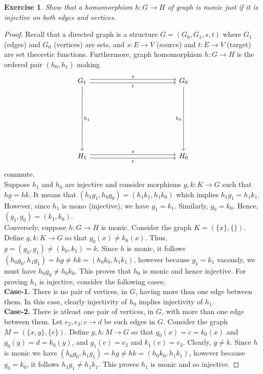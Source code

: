\documentclass[a4paper, 11pt]{book}
\theoremstyle{plain}
\newtheorem{exercise}{Exercise}[chapter]
\theoremstyle{plain}
\newcommand{\arr}{\rightarrow}
\newcommand{\tb}{\textbf}
\begin{document}
  \begin{exercise}
    Show that a homomorphism $h: G \arr H$ of graph is monic just if it is injective on both edges and vertices.
  \end{exercise}
  \begin{proof}
    Recall that a directed graph is a structure $G=(G_0, G_1, s,t)$ where $G_1$ (edges) and $G_0$ (vertices) are sets, and $s:E \arr V$ (source) and $t: E \arr V$ (target) are set theoretic functions. Furthermore, graph homomorphism $h: G \arr H$ is the ordered pair $(h_0, h_1)$ making 
    \[\begin{tikzcd}
      {G_1} &&&&& {G_0} \\
      \\
      \\
      \\
      \\
      {H_1} &&&&& {H_0}
      \arrow["s", shift left=1, from=1-1, to=1-6]
      \arrow["{h_1}", from=1-1, to=6-1]
      \arrow["{h_0}"', from=1-6, to=6-6]
      \arrow["s", shift left=1, from=6-1, to=6-6]
      \arrow["t"', shift right=1, from=1-1, to=1-6]
      \arrow["t"', shift right=1, from=6-1, to=6-6]
    \end{tikzcd}\]
    commute. \\
    Suppose $h_1$ and $h_0$ are injective and consider morphisms $g, k: K \arr G$ such that $hg=hk$. It means that $(h_1g_1, h_0g_0)=(h_1k_1, h_1k_0)$ which implies $h_1g_1=h_1k_1$. However, since $h_1$ is mono (injective), we have $g_1=k_1$. Similarly, $g_0=k_0$. Hence, $(g_1, g_0)=(k_1,k_0)$. \\
    Conversely, suppose $h:G \arr H$ is monic. Consider the graph $K=(\{x\}, \{\})$. Define $g,k:K \arr G$ so that $g_0(x) \not = k_0 (x)$. Thus, $g=(g_0, g_1) \not = (k_0, k_1)=k$. Since $h$ is monic, it follows $(h_0 g_0, h_1 g_1)=hg \not = hk=(h_0k_0, h_1 k_1)$, however because $g_1=k_1$ vacously, we must have $h_0 g_0 \not = h_0 k_0$. This proves that $h_0$ is monic and hence injective. For proving $h_1$ is injective, consider the following cases; \\
    \tb{Case-1.} There is no pair of vertices, in $G$, having more than one edge between them. In this case, clearly injectivity of $h_0$ implies injectivity of $h_1$. \\
    \tb{Case-2.} There is atleast one pair of vertices, in $G$, with more than one edge between them. Let $e_2,e_3:c \arr d$ be such edges in $G$. Consider the graph $M=(\{x,y\},\{e\})$. Define $g,h:M \arr G$ so that $g_0(x)=c=k_0(x)$ and $g_0(y)=d=k_0(y)$, and $g_1(e)=e_2$ and $k_1(e)=e_3$. Clearly, $g \not = k$. Since $h$ is monic we have $(h_0 g_0, h_1 g_1)=hg \not = hk=(h_0k_0, h_1 k_1)$, however because $g_0=k_0$, it follows $h_1 g_1 \not = h_1 k_1$. This proves $h_1$ is monic and so injective.
  \end{proof}
\end{document}
